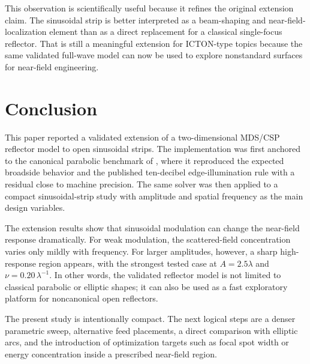 \documentclass[conference]{IEEEtran}
\begin{document}
This observation is scientifically useful because it refines the original extension claim. The sinusoidal strip is better interpreted as a beam-shaping and near-field-localization element than as a direct replacement for a classical single-focus reflector. That is still a meaningful extension for ICTON-type topics because the same validated full-wave model can now be used to explore nonstandard surfaces for near-field engineering.

\section{Conclusion}
This paper reported a validated extension of a two-dimensional MDS/CSP reflector model to open sinusoidal strips. The implementation was first anchored to the canonical parabolic benchmark of \cite{nosich2007}, where it reproduced the expected broadside behavior and the published ten-decibel edge-illumination rule with a residual close to machine precision. The same solver was then applied to a compact sinusoidal-strip study with amplitude and spatial frequency as the main design variables.

The extension results show that sinusoidal modulation can change the near-field response dramatically. For weak modulation, the scattered-field concentration varies only mildly with frequency. For larger amplitudes, however, a sharp high-response region appears, with the strongest tested case at $A=2.5\lambda$ and $\nu=0.20\,\lambda^{-1}$. In other words, the validated reflector model is not limited to classical parabolic or elliptic shapes; it can also be used as a fast exploratory platform for noncanonical open reflectors.

The present study is intentionally compact. The next logical steps are a denser parametric sweep, alternative feed placements, a direct comparison with elliptic arcs, and the introduction of optimization targets such as focal spot width or energy concentration inside a prescribed near-field region.
\end{document}

